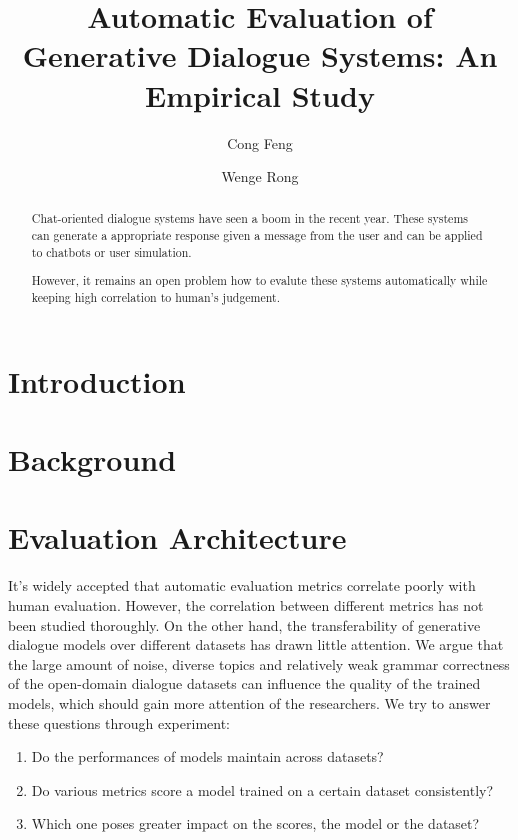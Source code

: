 \documentclass[runningheads]{llncs}
\begin{document}
\title{Automatic Evaluation of Generative Dialogue Systems: An Empirical Study}
%
%
\author{Cong Feng \and Wenge Rong}
%
%
%
%
\maketitle
%
\begin{abstract}
    Chat-oriented dialogue systems have seen a boom in the recent year.
    These systems can generate a appropriate response given a message from the user and
    can be applied to chatbots or user simulation.

    However, it remains an open problem how to evalute these systems automatically while
    keeping high correlation to human's judgement.



\end{abstract}
%
%
\section{Introduction}

\section{Background}

\section{Evaluation Architecture}
It's widely accepted that automatic evaluation metrics correlate poorly
with human evaluation. However, the correlation between different metrics
has not been studied thoroughly.
On the other hand, the transferability of generative dialogue models
over different datasets has drawn little attention.
We argue that the large amount of noise, diverse topics and
relatively weak grammar correctness of the open-domain dialogue datasets
can influence the quality of the trained models, which should gain more
attention of the researchers.
We try to answer these questions through experiment:
\begin{enumerate}
    \item Do the performances of models maintain across datasets?
    \item Do various metrics score a model trained on a certain dataset consistently?
    \item Which one poses greater impact on the scores, the model or the dataset?
\end{enumerate}
\end{document}
